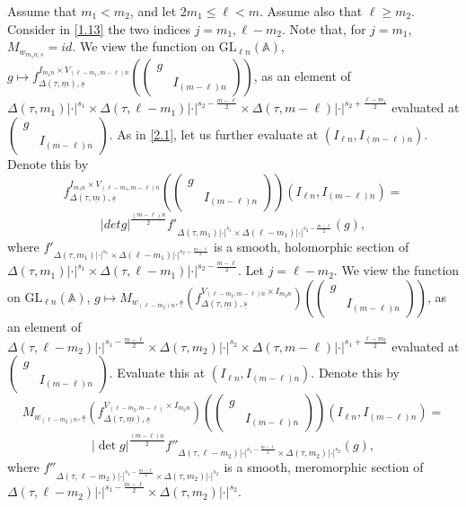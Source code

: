 \documentclass[12pts]{amsart}
\newcommand{\BA}{{\mathbb {A}}}
\newcommand{\GL}{{\mathrm{GL}}}
\begin{document}
	Assume that $m_1<m_2$, and let $2m_1\leq \ell<m$. Assume also that $\ell\geq m_2$. Consider in \eqref{1.13} the two indices $j=m_1, \ell-m_2$. Note that, for $j=m_1$, $M_{w_{m_1n,\underline{s}}}=id$. We view the function on $\GL_{\ell n}(\BA)$, $g\mapsto f^{I_{m_1n}\times V_{(\ell-m_1,m-\ell)n}}_{\Delta(\tau,\underline{m}),\underline{s}}(\begin{pmatrix}g\\&I_{(m-\ell)n}\end{pmatrix})$, as an element of $\Delta(\tau,m_1)|\cdot|^{s_1}\times \Delta(\tau,\ell-m_1)|\cdot|^{s_2-\frac{m-\ell}{2}}\times \Delta(\tau,m-\ell)|\cdot|^{s_2+\frac{\ell-m_1}{2}}$ evaluated at $\begin{pmatrix}g\\&I_{(m-\ell)n}\end{pmatrix}$. As in \eqref{2.1}, let us further evaluate at $(I_{\ell n}, I_{(m-\ell)n})$. Denote this by
	\begin{equation}\label{3.1}
	 f^{I_{m_1n}\times V_{(\ell-m_1,m-\ell)n}}_{\Delta(\tau,\underline{m}),\underline{s}}(\begin{pmatrix}g\\&I_{(m-\ell)n}\end{pmatrix})(I_{\ell n}, I_{(m-\ell)n})=
	 \end{equation}
	 $$
	 |det g|^{\frac{(m-\ell)n}{2}}f'_{\Delta(\tau,m_1)|\cdot|^{s_1}\times \Delta(\ell-m_1)|\cdot|^{s_2-\frac{m-\ell}{2}}}(g),
	 $$
	 where  $f'_{\Delta(\tau,m_1)|\cdot|^{s_1}\times \Delta(\ell-m_1)|\cdot|^{s_2-\frac{m-\ell}{2}}}$ is a smooth, holomorphic section of\\
	  $\Delta(\tau,m_1)|\cdot|^{s_1}\times \Delta(\tau,\ell-m_1)|\cdot|^{s_2-\frac{m-\ell}{2}}$. Let $j=\ell-m_2$. We view the function on $\GL_{\ell n}(\BA)$, $g\mapsto M_{w_{(\ell-m_2)n},\underline{s}}(f_{\Delta(\tau,\underline{m}),\underline{s}}^{V_{(\ell-m_2,m-\ell)n}\times I_{m_2n}})(\begin{pmatrix}g\\&I_{(m-\ell)n}\end{pmatrix})$, as an element of $\Delta(\tau, \ell-m_2)|\cdot|^{s_1-\frac{m-\ell}{2}}\times \Delta(\tau,m_2)|\cdot|^{s_2}\times \Delta(\tau,m-\ell)|\cdot|^{s_1+\frac{\ell-m_2}{2}}$ evaluated at $\begin{pmatrix}g\\&I_{(m-\ell)n}\end{pmatrix}$. Evaluate this at $(I_{\ell n},I_{(m-\ell)n})$. Denote this by
	 \begin{equation}\label{3.2}
	 M_{w_{(\ell-m_2)n},\underline{s}}(f_{\Delta(\tau,\underline{m}),\underline{s}}^{V_{(\ell-m_2,m-\ell)}\times I_{m_2n}})(\begin{pmatrix}g\\&I_{(m-\ell)n}\end{pmatrix})(I_{\ell n},I_{(m-\ell)n})=
	 \end{equation}
	 $$
	 |\det g|^{\frac{(m-\ell)n}{2}}f''_{\Delta(\tau, \ell-m_2)|\cdot|^{s_1-\frac{m-\ell}{2}}\times \Delta(\tau,m_2)|\cdot|^{s_2}}(g),
	 $$
	 where $f''_{\Delta(\tau, \ell-m_2)|\cdot|^{s_1-\frac{m-\ell}{2}}\times \Delta(\tau,m_2)|\cdot|^{s_2}}$ is a smooth, meromorphic section of $\Delta(\tau, \ell-m_2)|\cdot|^{s_1-\frac{m-\ell}{2}}\times \Delta(\tau,m_2)|\cdot|^{s_2}$.	
    	
\end{document}
